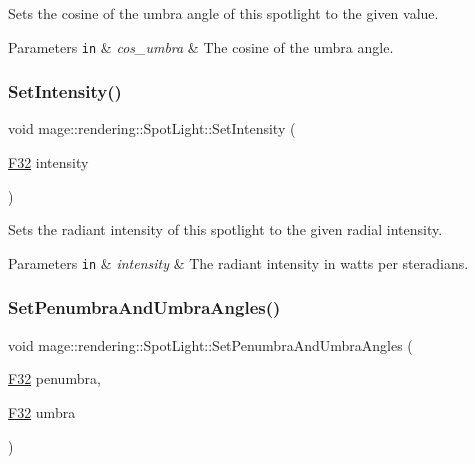 Sets the cosine of the umbra angle of this spotlight to the given value.


\begin{DoxyParams}[1]{Parameters}
\mbox{\tt in}  & {\em cos\+\_\+umbra} & The cosine of the umbra angle. \\
\hline
\end{DoxyParams}
\mbox{\label{classmage_1_1rendering_1_1_spot_light_aa59f043d14fb1e66377c9462c350717f}} 
\subsubsection{\texorpdfstring{Set\+Intensity()}{SetIntensity()}}
{\footnotesize\ttfamily void mage\+::rendering\+::\+Spot\+Light\+::\+Set\+Intensity (\begin{DoxyParamCaption}\item[{\mbox{\hyperlink{namespacemage_aa97e833b45f06d60a0a9c4fc22ae02c0}{F32}}}]{intensity }\end{DoxyParamCaption})\hspace{0.3cm}{\ttfamily [noexcept]}}

Sets the radiant intensity of this spotlight to the given radial intensity.


\begin{DoxyParams}[1]{Parameters}
\mbox{\tt in}  & {\em intensity} & The radiant intensity in watts per steradians. \\
\hline
\end{DoxyParams}
\mbox{\label{classmage_1_1rendering_1_1_spot_light_aa2e2c75dabaf5d33141d9b8a1163f317}} 
\subsubsection{\texorpdfstring{Set\+Penumbra\+And\+Umbra\+Angles()}{SetPenumbraAndUmbraAngles()}}
{\footnotesize\ttfamily void mage\+::rendering\+::\+Spot\+Light\+::\+Set\+Penumbra\+And\+Umbra\+Angles (\begin{DoxyParamCaption}\item[{\mbox{\hyperlink{namespacemage_aa97e833b45f06d60a0a9c4fc22ae02c0}{F32}}}]{penumbra,  }\item[{\mbox{\hyperlink{namespacemage_aa97e833b45f06d60a0a9c4fc22ae02c0}{F32}}}]{umbra }\end{DoxyParamCaption})\hspace{0.3cm}{\ttfamily [noexcept]}}


